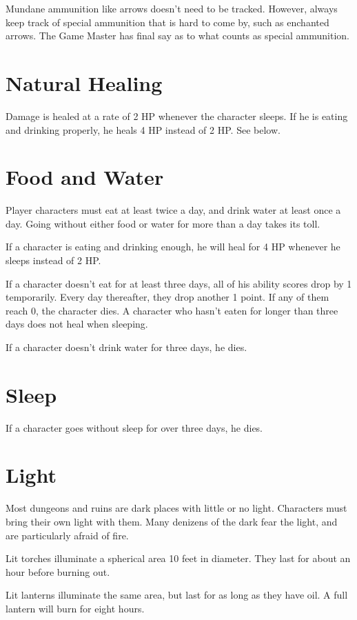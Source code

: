 \begin{multicols}{2}
Mundane ammunition like arrows doesn't need to be tracked. However, always
keep track of special ammunition that is hard to come by, such as enchanted
arrows. The Game Master has final say as to what counts as special ammunition.

\section{Natural Healing}

Damage is healed at a rate of 2 HP whenever the character sleeps. If he is
eating and drinking properly, he heals 4 HP instead of 2 HP. See below.

\section{Food and Water}

Player characters must eat at least twice a day, and drink water at least
once a day. Going without either food or water for more than a day takes its
toll.

If a character is eating and drinking enough, he will heal for 4 HP whenever
he sleeps instead of 2 HP.

If a character doesn't eat for at least three days, all of his ability scores
drop by 1 temporarily. Every day thereafter, they drop another 1 point. If
any of them reach 0, the character dies. A character who hasn't eaten for
longer than three days does not heal when sleeping.

If a character doesn't drink water for three days, he dies.

\section{Sleep}

If a character goes without sleep for over three days, he dies.

\section{Light}

Most dungeons and ruins are dark places with little or no light. Characters
must bring their own light with them. Many denizens of the dark fear the
light, and are particularly afraid of fire.

Lit torches illuminate a spherical area 10 feet in diameter. They last for
about an hour before burning out.

Lit lanterns illuminate the same area, but last for as long as they have oil.
A full lantern will burn for eight hours.


\end{multicols}

